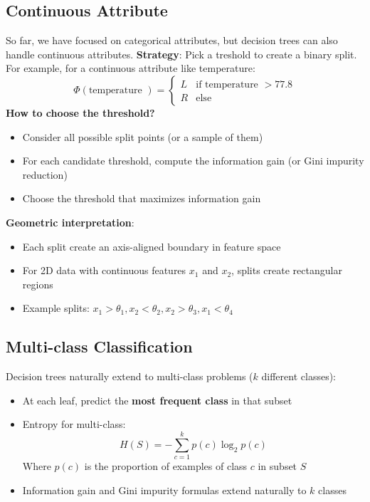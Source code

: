 \documentclass[a4paper]{article}
\theoremstyle{definition}
\begin{document}
\subsection{Continuous Attribute}
So far, we have focused on categorical attributes, but decision trees can also handle continuous attributes.
\vspace{1em}
\noindent
\newline
\textbf{Strategy}: Pick a treshold to create a binary split.
\vspace{1em}
\noindent
\newline
For example, for a continuous attribute like temperature:
\[
  \Phi(\text{temperature }) = \begin{cases}
    L & \text{if temperature } > 77.8 \\
    R & \text{else}
  \end{cases}
\]
\textbf{How to choose the threshold?}
\begin{itemize}
    \item Consider all possible split points (or a sample of them)
    \item For each candidate threshold, compute the information gain (or Gini impurity reduction)
    \item Choose the threshold that maximizes information gain
\end{itemize}
\textbf{Geometric interpretation}:
\begin{itemize}
    \item Each split create an axis-aligned boundary in feature space 
    \item For 2D data with continuous features \( x_1 \) and \( x_2 \), splits create rectangular regions 
    \item Example splits: \( x_1 > \theta_1, x_2 < \theta_2, x_2 > \theta_3, x_1 < \theta_4 \)  
\end{itemize}
\subsection{Multi-class Classification}
Decision trees naturally extend to multi-class problems ($k$ different classes):
\begin{itemize}
    \item At each leaf, predict the \textbf{most frequent class} in that subset 
    \item Entropy for multi-class:
    \[
      H(S) = - \sum_{c = 1}^{k} p(c)\log_2 p(c)
    \]
    Where \( p(c) \) is the proportion of examples of class \( c \) in subset \( S \)
    \item Information gain and Gini impurity formulas extend naturally to \( k \) classes
\end{itemize}
\end{document}
